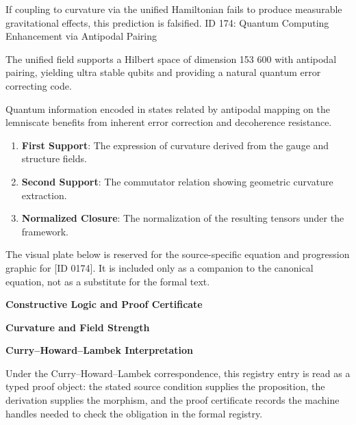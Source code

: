 If coupling to curvature via the unified Hamiltonian fails to produce measurable gravitational effects, this prediction is falsified. ID 174: Quantum Computing Enhancement via Antipodal Pairing  

The unified field supports a Hilbert space of dimension 153 600 with antipodal pairing, yielding ultra stable qubits and providing a natural quantum error correcting code.

Quantum information encoded in states related by antipodal mapping on the lemniscate benefits from inherent error correction and decoherence resistance.  
\endgroup

\begin{enumerate}[leftmargin=1.6em,itemsep=6pt,topsep=4pt]
\item \textbf{First Support}: The expression of curvature derived from the gauge and structure fields.
\item \textbf{Second Support}: The commutator relation showing geometric curvature extraction.
\item \textbf{Normalized Closure}: The normalization of the resulting tensors under the framework.
\end{enumerate}

\begingroup\footnotesize\sloppy
The visual plate below is reserved for the source-specific equation and progression graphic for [ID 0174]. It is included only as a companion to the canonical equation, not as a substitute for the formal text.
\par\endgroup
\ifTZPDarkEdition
{}
\fi

\clearpage
\begingroup\tzpsupportsetup
\noindent\textbf{\fontsize{10.8pt}{12.8pt}\selectfont [ID 0174] Constructive Logic and Proof Certificate}\par
\noindent\textbf{\fontsize{10pt}{12pt}\selectfont Curvature and Field Strength}\par
\vspace{0.45em}
\begingroup
\footnotesize
\setlength{\parskip}{0.22em}
\setlength{\parindent}{0pt}
\noindent\textbf{Curry--Howard--Lambek Interpretation}\par
Under the Curry--Howard--Lambek correspondence, this registry entry is read as a typed proof
object: the stated source condition supplies the proposition, the derivation supplies the
morphism, and the proof certificate records the machine handles needed to check the obligation
in the formal registry.

